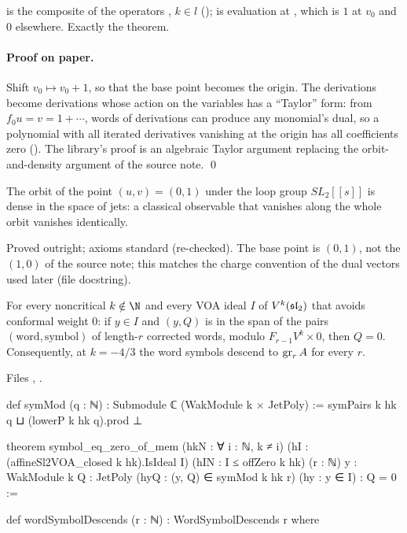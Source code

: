 \begin{dictionary}
 is the composite of the operators , $k\in l$ ();  is evaluation at
, which is $1$ at $v_0$ and $0$ elsewhere. Exactly the theorem.
\end{dictionary}

\paragraph{Proof on paper.} Shift $v_0\mapsto v_0+1$, so that the base point becomes the origin. The derivations become derivations whose action on the
variables has a ``Taylor'' form: from $f_0u=v=1+\cdots$, words of derivations can produce any monomial's dual, so a polynomial with all iterated
derivatives vanishing at the origin has all coefficients zero (). The library's proof is an algebraic Taylor argument replacing
the orbit-and-density argument of the source note. \qed

\begin{physics}
The orbit of the point $(u,v)=(0,1)$ under the loop group $SL_2[[s]]$ is dense in the space of jets: a classical observable that vanishes along the
whole orbit vanishes identically.
\end{physics}

\begin{status}
Proved outright; axioms standard (re-checked). The base point is $(0,1)$, not the $(1,0)$ of the source note; this matches the charge convention of the
dual vectors used later (file docstring).
\end{status}

\begin{theorem}\label{l28:thm:desc}
For every noncritical $k\notin\N$ and every VOA ideal $I$ of $V^k(\mathfrak{sl}_2)$ that avoids conformal weight $0$: if $y\in I$ and $(y,Q)$ is in the
span of the pairs $(\text{word},\text{symbol})$ of length-$r$ corrected words, modulo $F_{r-1}V^k\times0$, then $Q=0$. Consequently, at $k=-4/3$ the
word symbols descend to $\operatorname{gr}_rA$ for every $r$.
\end{theorem}

\noindent Files , .
\begin{leancode}
def symMod (q : ℕ) : Submodule ℂ (WakModule k × JetPoly) :=
  symPairs k hk q ⊔ (lowerP k hk q).prod ⊥

theorem symbol_eq_zero_of_mem (hkN : ∀ i : ℕ, k ≠ i)
    (hI : (affineSl2VOA_closed k hk).IsIdeal I) (hIN : I ≤ offZero k hk) (r : ℕ)
    {y : WakModule k} {Q : JetPoly} (hyQ : (y, Q) ∈ symMod k hk r) (hy : y ∈ I) : Q = 0 :=

def wordSymbolDescends (r : ℕ) : WordSymbolDescends r where
\end{leancode}

